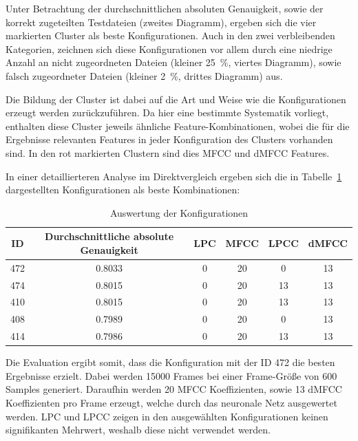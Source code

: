 Unter Betrachtung der durchschnittlichen absoluten Genauigkeit, sowie der korrekt zugeteilten Testdateien (zweites Diagramm), ergeben sich die vier markierten Cluster als beste Konfigurationen.
Auch in den zwei verbleibenden Kategorien, zeichnen sich diese Konfigurationen vor allem durch eine niedrige Anzahl an nicht zugeordneten Dateien (kleiner 25~\%, viertes Diagramm), sowie falsch zugeordneter Dateien (kleiner 2~\%, drittes Diagramm) aus.

Die Bildung der Cluster ist dabei auf die Art und Weise wie die Konfigurationen erzeugt werden zurückzuführen.
Da hier eine bestimmte Systematik vorliegt, enthalten diese Cluster jeweils ähnliche Feature-Kombinationen, wobei die für die Ergebnisse relevanten Features in jeder Konfiguration des Clusters vorhanden sind.
In den rot markierten Clustern sind dies \ac{MFCC} und \ac{dMFCC} Features.

In einer detaillierteren Analyse im Direktvergleich ergeben sich die in Tabelle~\ref{table:ergebnisOutput} dargestellten Konfigurationen als beste Kombinationen:
\begin{table}[H]
    \centering
    \begin{tabular}{c|c|c|c|c|c}
    ID  & Durchschnittliche absolute Genauigkeit & \ac{LPC} & \ac{MFCC} & \ac{LPCC} & \ac{dMFCC} \\ \hline
    472 &                                 0.8033 &        0 &        20 &         0 &         13 \\ \hline
    474 &                                 0.8015 &        0 &        20 &        13 &         13 \\ \hline
    410 &                                 0.8015 &        0 &        20 &        13 &         13 \\ \hline
    408 &                                 0.7989 &        0 &        20 &         0 &         13 \\ \hline
    414 &                                 0.7986 &        0 &        20 &        13 &         13 \\
    \end{tabular}
    \caption{Auswertung der Konfigurationen}
    \label{table:ergebnisOutput}
\end{table}

Die Evaluation ergibt somit, dass die Konfiguration mit der ID 472 die besten Ergebnisse erzielt.
Dabei werden 15000 Frames bei einer Frame-Größe von 600 Samples generiert.
Daraufhin werden 20 \ac{MFCC} Koeffizienten, sowie 13 \ac{dMFCC} Koeffizienten pro Frame erzeugt, welche durch das neuronale Netz ausgewertet werden.
\ac{LPC} und \ac{LPCC} zeigen in den ausgewählten Konfigurationen keinen signifikanten Mehrwert, weshalb diese nicht verwendet werden.

